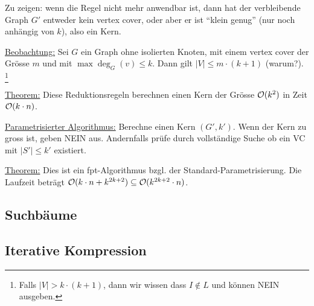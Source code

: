 Zu zeigen: wenn die Regel nicht mehr anwendbar ist, dann hat der verbleibende Graph $G'$ entweder kein vertex cover,
oder aber er ist ``klein genug'' (nur noch anhängig von $k$), also ein Kern.

\underline{Beobachtung:}
Sei $G$ ein Graph ohne isolierten Knoten, mit einem vertex cover der Grösse $m$ und mit $\max \deg_G(v) \leq k$.
Dann gilt $|V| \leq m \cdot (k+1)$ (warum?).%
\footnote{Falls $|V| > k \cdot (k+1)$, dann wir wissen dass $ I \notin L$ und können NEIN ausgeben.}

\underline{Theorem:}
Diese Reduktionsregeln berechnen einen Kern der Grösse $\mathcal{O} (k^2)$ in Zeit $\mathcal{O} (k \cdot n)$.

\underline{Parametrisierter Algorithmus:}
Berechne einen Kern $(G', k')$. Wenn der Kern zu gross ist, geben NEIN aus.
Andernfalls prüfe durch vollständige Suche ob ein VC mit $|S'| \leq k'$ existiert.

\underline{Theorem:}
Dies ist ein fpt-Algorithmus bzgl. der Standard-Parametrisierung. Die Laufzeit beträgt
$\mathcal{O} (k \cdot n + k^{2k+2}) \subseteq \mathcal{O} (k^{2k+2} \cdot n)$.


\subsection{Suchbäume}


\subsection{Iterative Kompression}


